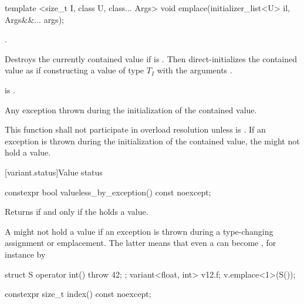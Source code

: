 %
\begin{itemdecl}
template <size_t I, class U, class... Args> void emplace(initializer_list<U> il, Args&&... args);
\end{itemdecl}

\begin{itemdescr}
\pnum
\requires
{}.

\pnum
\effects
Destroys the currently contained value if 
is . Then direct-initializes the contained value as if
constructing a value of type $T_I$ with the arguments
.

\pnum
\postconditions
{} is .

\pnum
\throws
Any exception thrown during the initialization of the contained value.

\pnum
\remarks
This function shall not participate in overload resolution unless
 is .
If an exception is thrown during the initialization of the contained value,
the  might not hold a value.
\end{itemdescr}

[variant.status]{Value status}

%
\begin{itemdecl}
constexpr bool valueless_by_exception() const noexcept;
\end{itemdecl}

\begin{itemdescr}
\pnum
\effects
Returns  if and only if the  holds a value.

\pnum
\begin{note}
A  might not hold a value if an exception is thrown during a
type-changing assignment or emplacement. The latter means that even a
 can become , for
instance by
\begin{codeblock}
struct S { operator int() { throw 42; }};
variant<float, int> v{12.f};
v.emplace<1>(S());
\end{codeblock}
\end{note}
\end{itemdescr}

%
\begin{itemdecl}
constexpr size_t index() const noexcept;
\end{itemdecl}

